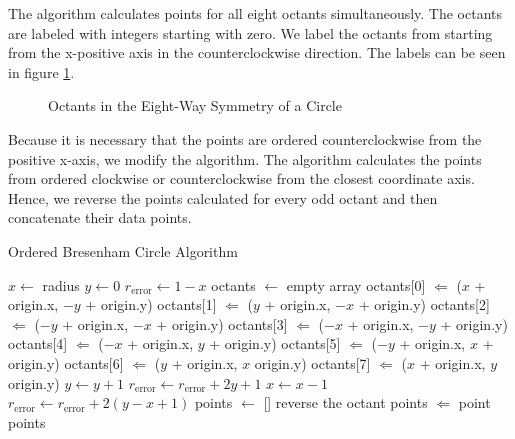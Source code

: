 \documentclass{sig-alternate}
\begin{document}
		The algorithm calculates points for all eight octants simultaneously.
		The octants are labeled with integers starting with zero. We label the
		octants from starting from the x-positive axis in the counterclockwise
		direction. The labels can be seen in figure \ref{fig:eightsymmetry}.
		\begin{figure}[htp]
			\centering
			
			\caption{Octants in the Eight-Way Symmetry of a Circle}
			\label{fig:eightsymmetry}
		\end{figure}
		Because it is necessary that the points are ordered
		counterclockwise from the positive x-axis, we modify the
		algorithm. The algorithm calculates the points from ordered
		clockwise or counterclockwise from the closest coordinate axis.
		Hence, we reverse the points calculated for every odd octant and
		then concatenate their data points.

		\begin{algorithm}[ht!]
			\caption{Ordered Bresenham Circle Algorithm}
			\begin{algorithmic}
					\State $x \gets$ radius
					\State $y \gets 0$
					\State $r_{\text{error}} \gets 1 - x$
					\State octants $\gets$ empty array
						\State octants[0] $\Leftarrow$ ($x$ + origin.x, $-y$ + origin.y)
						\State octants[1] $\Leftarrow$ ($y$ + origin.x, $-x$ + origin.y)
						\State octants[2] $\Leftarrow$ ($-y$ + origin.x, $-x$ + origin.y)
						\State octants[3] $\Leftarrow$ ($-x$ + origin.x, $-y$ + origin.y)
						\State octants[4] $\Leftarrow$ ($-x$ + origin.x, $y$ + origin.y)
						\State octants[5] $\Leftarrow$ ($-y$ + origin.x, $x$ + origin.y)
						\State octants[6] $\Leftarrow$ ($y$ + origin.x, $x$ origin.y)
						\State octants[7] $\Leftarrow$ ($x$ + origin.x, $y$ origin.y)
						\State $y \gets y + 1$
							\State $r_{\text{error}} \gets r_{\text{error}} + 2y + 1$
						\Else
							\State $x \gets x - 1$
							\State $r_{\text{error}} \gets r_{\text{error}} + 2(y - x + 1)$
						\EndIf
					\EndWhile
					\State points $\gets$ []
							\State reverse the octant
						\EndIf
							\State points $\Leftarrow$ point
						\EndFor
					\EndFor
					\State \Return points
				\EndProcedure
			\end{algorithmic}
		\end{algorithm}

\end{document}
